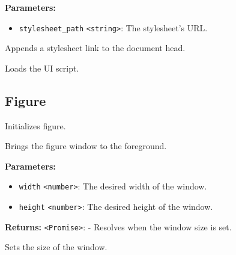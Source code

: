 \documentclass[12pt,a4paper]{article}
\begin{document}
\noindent \textbf{Parameters:}
\begin{itemize}
  \item \texttt{stylesheet\_path} \texttt{<string>}: The stylesheet's URL.
\end{itemize}

\noindent Appends a stylesheet link to the document head.

\vspace{5mm}
\noindent {}


\noindent Loads the UI script.


\subsection{Figure}
\vspace{5mm}
\noindent {}


\noindent Initializes figure.

\vspace{5mm}
\noindent {}


\noindent Brings the figure window to the foreground.

\vspace{5mm}
\noindent {}


\noindent \textbf{Parameters:}
\begin{itemize}
  \item \texttt{width} \texttt{<number>}: The desired width of the window.
  \item \texttt{height} \texttt{<number>}: The desired height of the window.
\end{itemize}

\noindent \textbf{Returns:} \texttt{<Promise>}: - Resolves when the window size is set.

\noindent Sets the size of the window.

\vspace{5mm}
\noindent {}
\end{document}

